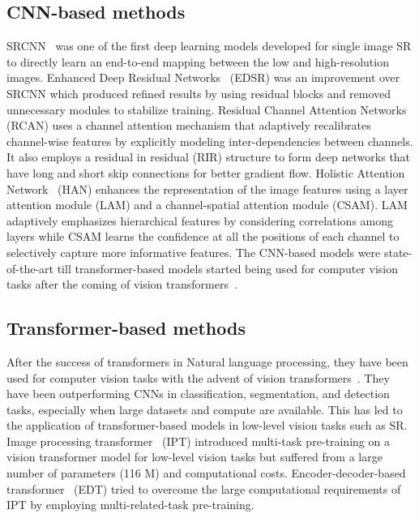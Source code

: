 \documentclass{article}
\begin{document}
\subsection{CNN-based methods}
SRCNN~\cite{dong2015image} was one of the first deep learning models developed for single image SR to directly learn an end-to-end mapping between the low and high-resolution images. Enhanced Deep Residual Networks~\cite{lim2017enhanced} (EDSR) was an improvement over SRCNN which produced refined results by using residual blocks and removed unnecessary modules to stabilize training. Residual Channel Attention Networks~\cite{zhang2018image} (RCAN) uses a channel attention mechanism that adaptively recalibrates channel-wise features by explicitly modeling inter-dependencies between channels. It also employs a residual in residual (RIR) structure to form deep networks that have long and short skip connections for better gradient flow. Holistic Attention Network~\cite{niu2020single} (HAN) enhances the representation of the image features using a layer attention module (LAM) and a channel-spatial attention module (CSAM). LAM adaptively emphasizes hierarchical features by considering correlations among layers while CSAM learns the confidence at all the positions of each channel to selectively capture more informative features. The CNN-based models were state-of-the-art till transformer-based models started being used for computer vision tasks after the coming of vision transformers~\cite{dosovitskiy2021image}.



\subsection{Transformer-based methods}

After the success of transformers in Natural language processing, they have been used for computer vision tasks with the advent of vision transformers~\cite{dosovitskiy2021image}. They have been outperforming CNNs in classification, segmentation, and detection tasks, especially when large datasets and compute are available. This has led to the application of transformer-based models in low-level vision tasks such as SR. Image processing transformer~\cite{chen2021pretrained} (IPT) introduced multi-task pre-training on a vision transformer model for low-level vision tasks but suffered from a large number of parameters (116 M) and computational costs.  Encoder-decoder-based transformer~\cite{li2022efficient} (EDT) tried to overcome the large computational requirements of IPT by employing multi-related-task pre-training.
\end{document}
